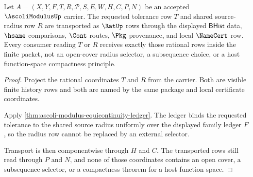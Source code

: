 \begin{theorem}
\label{thm:ascoli-modulus-rational-radius-transport}
Let $A=(X,Y,F,T,R,\mathcal{P},S,E,W,H,C,P,N)$ be an accepted $\AscoliModulusUp$ carrier. The requested tolerance row $T$ and shared source-radius row $R$ are transported as $\RatUp$ rows through the displayed $\mathsf{BHist}$ data, $\hsame$ comparisons, $\Cont$ routes, $\Pkg$ provenance, and local $\NameCert$ row. Every consumer reading $T$ or $R$ receives exactly those rational rows inside the finite packet, not an open-cover radius selector, a subsequence choice, or a host function-space compactness principle.
\end{theorem}
\begin{proof}
Project the rational coordinates $T$ and $R$ from the carrier. Both are visible finite history rows and both are named by the same package and local certificate coordinates.

Apply \autoref{thm:ascoli-modulus-equicontinuity-ledger}. The ledger binds the requested tolerance to the shared source radius uniformly over the displayed family ledger $F$, so the radius row cannot be replaced by an external selector.

Transport is then componentwise through $H$ and $C$. The transported rows still read through $P$ and $N$, and none of those coordinates contains an open cover, a subsequence selector, or a compactness theorem for a host function space.
\end{proof}

